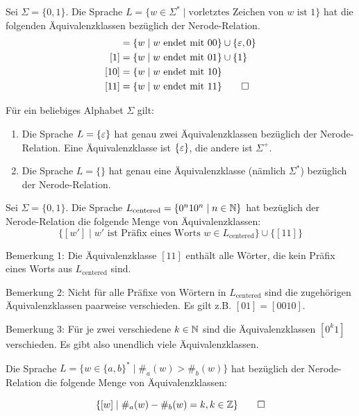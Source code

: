 \begin{Bsp}
Sei $\Sigma=\{0,1\}$. Die Sprache $L=\{w\in\Sigma^*\mid \text{vorletztes Zeichen von $w$ ist } 1\}$ hat die folgenden Äquivalenzklassen bezüglich der Nerode-Relation.
        \begin{align*}
        [\Eps] &= \{w\mid w \text{ endet mit } 00 \} \cup \{\varepsilon, 0\}\\
        [1] &= \{w\mid w \text{ endet mit } 01 \} \cup \{1\}\\
        [10] &= \{w\mid w \text{ endet mit } 10 \}\\
        [11] &= \{w\mid w \text{ endet mit } 11 \}
        \qedhere
        \end{align*}
\end{Bsp}
\begin{Bsp}
      Für ein beliebiges Alphabet $\Sigma$ gilt:
      \begin{enumerate}
       \item Die Sprache $L=\{\varepsilon\}$ hat genau zwei Äquivalenzklassen bezüglich der Nerode-Relation.
      Eine Äquivalenzklasse ist $\{\varepsilon\}$, die andere ist $\Sigma^+$.
       \item Die Sprache $L=\{\}$ hat genau eine Äquivalenzklasse (nämlich $\Sigma^*$) bezüglich der Nerode-Relation.
       \qedhere
      \end{enumerate}
\end{Bsp}

\begin{Bsp}\label{bsp:2.centeredMyhillNerode}
Sei $\Sigma=\{0,1\}$. Die Sprache $L_\text{centered}=\{0^n10^n \mid n\in\mathbb{N}\}$ hat bezüglich der Nerode-Relation die folgende Menge von Äquivalenzklassen:
$$\{ [w'] \mid w' \text{ ist Präfix eines Worts } w\in L_\text{centered}\} \cup \{ [11] \}$$

Bemerkung 1: Die Äquivalenzklasse $[11]$ enthält alle Wörter, die kein Präfix eines Worts aus $L_\text{centered}$ sind.

Bemerkung 2: Nicht für alle Präfixe von Wörtern in $L_\text{centered}$ sind die zugehörigen Äquivalenzklassen paarweise verschieden. Es gilt z.B. $[01]=[0010]$.

Bemerkung 3: Für je zwei verschiedene $k\in\mathbb{N}$ sind die Äquivalenzklassen $[0^k1]$ verschieden. Es gibt also unendlich viele Äquivalenzklassen.
\end{Bsp}

\begin{Bsp}\label{bsp:2.lettercountNerode}
 Die Sprache $L=\{w \in \{a,b\}^* \mid \#_a(w) > \#_b(w)\}$ hat bezüglich der Nerode-Relation die folgende Menge von Äquivalenzklassen:%

 \[
 \{ [w] \mid  \#_a(w) - \#_b(w)=k, k\in\mathbb{Z} \}
 \qedhere
 \]
\end{Bsp}



